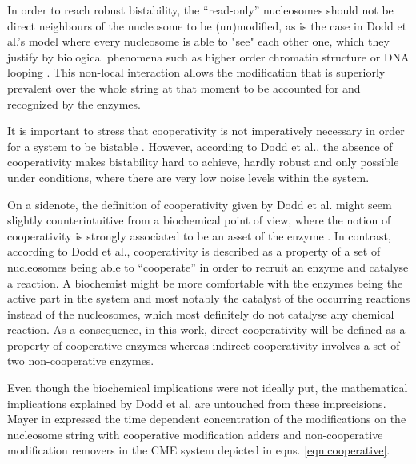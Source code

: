             In order to reach robust bistability, the “read-only” nucleosomes should not be direct neighbours of the nucleosome to be (un)modified, as is the case in Dodd et al.'s model where every nucleosome is able to "see" each other one, which they justify by biological phenomena such as higher order chromatin structure or DNA looping \cite{dodd2007theoretical}. This non-local interaction allows the modification that is superiorly prevalent over the whole string at that moment to be accounted for and recognized by the enzymes.

            It is important to stress that cooperativity is not imperatively necessary in order for a system to be bistable \cite{dodd2007theoretical}. However, according to Dodd et al., the absence of cooperativity makes bistability hard to achieve, hardly robust and only possible under conditions, where there are very low noise levels within the system.

            On a sidenote, the definition of cooperativity given by Dodd et al. might seem slightly counterintuitive from a biochemical point of view, where the notion of cooperativity is strongly associated to be an asset of the enzyme \cite{cooperativityDefBritannica}. In contrast, according to Dodd et al., cooperativity is described as a property of a set of nucleosomes being able to “cooperate” in order to recruit an enzyme and catalyse a reaction. A biochemist might be more comfortable with the enzymes being the active part in the system and most notably the catalyst of the occurring reactions instead of the nucleosomes, which most definitely do not catalyse any chemical reaction. As a consequence, in this work, direct cooperativity will be defined as a property of cooperative enzymes whereas indirect cooperativity involves a set of two non-cooperative enzymes.

            Even though the biochemical implications were not ideally put, the mathematical implications explained by Dodd et al. are untouched from these imprecisions.\\

            Mayer in \cite{mayer2020langevin} expressed the time dependent concentration of the modifications on the nucleosome string with cooperative modification adders and non-cooperative modification removers in the CME system depicted in eqns. \ref{eqn:cooperative}.

